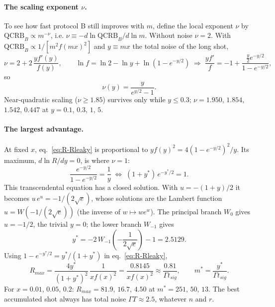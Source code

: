 \paragraph{The scaling exponent $\nu$.} To see how fast protocol B still improves with $m$, define the local exponent $\nu$ by $\mathrm{QCRB}_B \propto m^{-\nu}$, i.e. $\nu \equiv -d\ln\mathrm{QCRB}_B/d\ln m$. Without noise $\nu = 2$. With $\mathrm{QCRB}_B \propto 1/[m^2f(mx)^2]$ and $y \equiv mx$ the total noise of the long shot,
\begin{equation*}
    \nu = 2 + 2\,\frac{y f'(y)}{f(y)},
    \qquad
    \ln f = \ln 2 - \ln y + \ln\!\left(1 - e^{-y/2}\right)
    \;\Rightarrow\;
    \frac{yf'}{f} = -1 + \frac{\tfrac{y}{2}e^{-y/2}}{1 - e^{-y/2}},
\end{equation*}
so
\begin{equation}
\label{eq:R-nu}
    \nu(y) = \frac{y}{e^{y/2} - 1}.
\end{equation}
Near-quadratic scaling ($\nu \ge 1.85$) survives only while $y \le 0.3$; $\nu = 1.950$, $1.854$, $1.542$, $0.447$ at $y = 0.1$, $0.3$, $1$, $5$.

\paragraph{The largest advantage.} At fixed $x$, eq.~\eqref{eq:R-Rleaky} is proportional to $y f(y)^2 = 4(1 - e^{-y/2})^2/y$. Its maximum, $d\ln R/dy = 0$, is where $\nu = 1$:
\begin{equation*}
    \frac{e^{-y/2}}{1 - e^{-y/2}} = \frac{1}{y}
    \;\Longleftrightarrow\;
    (1 + y^*)\,e^{-y^*/2} = 1 .
\end{equation*}
This transcendental equation has a closed solution. With $u = -(1 + y)/2$ it becomes $u\,e^u = -1/(2\sqrt{e})$, whose solutions are the Lambert function $u = W(-1/(2\sqrt{e}))$ (the inverse of $w \mapsto we^w$). The principal branch $W_0$ gives $u = -1/2$, the trivial $y = 0$; the lower branch $W_{-1}$ gives
\begin{equation}
\label{eq:R-ystar}
    y^* = -2\,W_{-1}\!\left(-\frac{1}{2\sqrt{e}}\right) - 1 = 2.5129 .
\end{equation}
Using $1 - e^{-y^*/2} = y^*/(1 + y^*)$ in eq.~\eqref{eq:R-Rleaky},
\begin{equation}
\label{eq:R-Rmax}
    R_{max} = \frac{4y^*}{(1 + y^*)^2}\,\frac{1}{x f(x)^2} = \frac{0.8145}{x f(x)^2} \approx \frac{0.81}{\Gamma t_{sig}},
    \qquad
    m^* = \frac{y^*}{\Gamma t_{sig}} .
\end{equation}
For $x = 0.01$, $0.05$, $0.2$: $R_{max} = 81.9$, $16.7$, $4.50$ at $m^* = 251$, $50$, $13$. The best accumulated shot always has total noise $\Gamma T \approx 2.5$, whatever $n$ and $r$.

